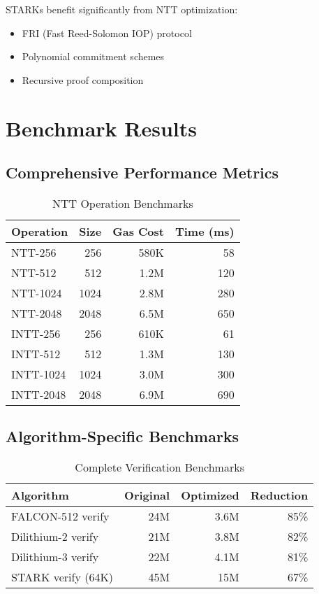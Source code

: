 \documentclass[11pt,a4paper]{article}
\begin{document}
STARKs benefit significantly from NTT optimization:

\begin{itemize}
\item FRI (Fast Reed-Solomon IOP) protocol
\item Polynomial commitment schemes
\item Recursive proof composition
\end{itemize}

\section{Benchmark Results}

\subsection{Comprehensive Performance Metrics}

\begin{table}[h]
\centering
\caption{NTT Operation Benchmarks}
\begin{tabular}{lrrr}
\toprule
Operation & Size & Gas Cost & Time (ms) \\
\midrule
NTT-256 & 256 & 580K & 58 \\
NTT-512 & 512 & 1.2M & 120 \\
NTT-1024 & 1024 & 2.8M & 280 \\
NTT-2048 & 2048 & 6.5M & 650 \\
\midrule
INTT-256 & 256 & 610K & 61 \\
INTT-512 & 512 & 1.3M & 130 \\
INTT-1024 & 1024 & 3.0M & 300 \\
INTT-2048 & 2048 & 6.9M & 690 \\
\bottomrule
\end{tabular}
\end{table}

\subsection{Algorithm-Specific Benchmarks}

\begin{table}[h]
\centering
\caption{Complete Verification Benchmarks}
\begin{tabular}{lrrr}
\toprule
Algorithm & Original & Optimized & Reduction \\
\midrule
FALCON-512 verify & 24M & 3.6M & 85\% \\
Dilithium-2 verify & 21M & 3.8M & 82\% \\
Dilithium-3 verify & 22M & 4.1M & 81\% \\
STARK verify (64K) & 45M & 15M & 67\% \\
\bottomrule
\end{tabular}
\end{table}
\end{document}
